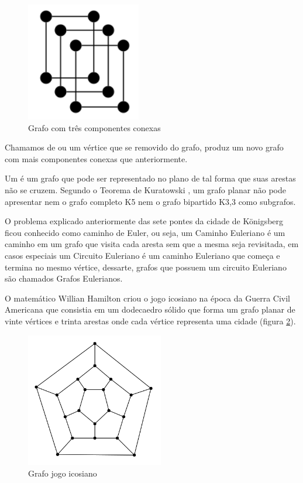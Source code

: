 \documentclass[a4paper]{abnt}
\begin{document}
\begin{figure}[htb]
    \centering
	\includegraphics[width=5cm]{component.png}
	\caption{Grafo com três componentes conexas}
	\label{img_component}
\end{figure}

Chamamos de  ou  um vértice que se removido do grafo, produz um novo grafo com mais componentes conexas que anteriormente.

Um  é um grafo que pode ser representado no plano de tal forma que suas arestas não se cruzem. Segundo o Teorema de Kuratowski \cite{kuratowski}, um grafo planar não pode apresentar nem o grafo completo K5 nem o grafo bipartido K3,3 como subgrafos.

O problema explicado anteriormente das sete pontes da cidade de Königsberg ficou conhecido como caminho de Euler, ou seja, um Caminho Euleriano é um caminho em um grafo que visita cada aresta sem que a mesma seja revisitada, em casos especiais um Circuito Euleriano é um caminho Euleriano que começa e termina no mesmo vértice, dessarte, grafos que possuem um circuito Euleriano são chamados Grafos Eulerianos. 

O matemático Willian Hamilton \cite{hamilton} criou o jogo icosiano na época da Guerra Civil Americana que consistia em um dodecaedro sólido que forma um grafo planar de vinte vértices e trinta arestas onde cada vértice representa uma cidade (figura \ref{img_icosian}).

\begin{figure}[htb]
    \centering
	\includegraphics[width=6cm]{icosian.png}
	\caption{Grafo jogo icosiano}
	\label{img_icosian}
\end{figure}
\end{document}
